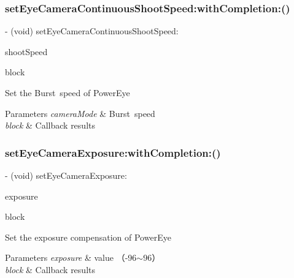 \subsubsection{\texorpdfstring{set\+Eye\+Camera\+Continuous\+Shoot\+Speed\+:with\+Completion\+:()}{setEyeCameraContinuousShootSpeed:withCompletion:()}}
{\footnotesize\ttfamily -\/ (void) set\+Eye\+Camera\+Continuous\+Shoot\+Speed\+: \begin{DoxyParamCaption}\item[{(P\+V\+Eye\+Camera\+Continuous\+Shoot\+Speed)}]{shoot\+Speed }\item[{withCompletion:(P\+V\+Completion\+Block)}]{block }\end{DoxyParamCaption}}

Set the Burst speed of Power\+Eye


\begin{DoxyParams}{Parameters}
{\em camera\+Mode} & Burst speed \\
\hline
{\em block} & Callback results \\
\hline
\end{DoxyParams}
\mbox{\label{interface_p_v_eye_camera_a666f4c3fd4b6979c5e62bbedee070b7f}} 
\subsubsection{\texorpdfstring{set\+Eye\+Camera\+Exposure\+:with\+Completion\+:()}{setEyeCameraExposure:withCompletion:()}}
{\footnotesize\ttfamily -\/ (void) set\+Eye\+Camera\+Exposure\+: \begin{DoxyParamCaption}\item[{(N\+S\+Integer)}]{exposure }\item[{withCompletion:(P\+V\+Completion\+Block)}]{block }\end{DoxyParamCaption}}

Set the exposure compensation of Power\+Eye


\begin{DoxyParams}{Parameters}
{\em exposure} & value （-\/96$\sim$96） \\
\hline
{\em block} & Callback results \\
\hline
\end{DoxyParams}
\mbox{\label{interface_p_v_eye_camera_a6f73da736c5c4bae29775134603754cf}} 
